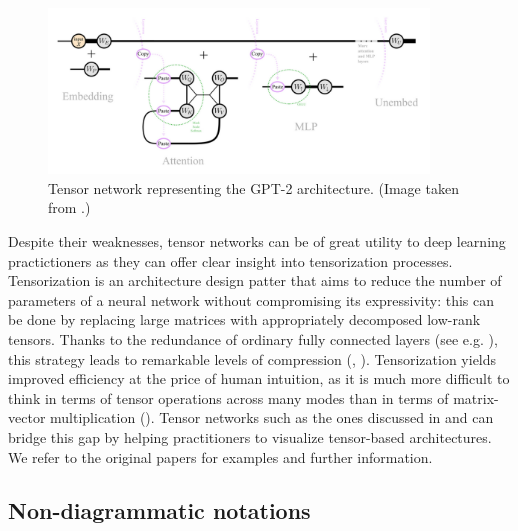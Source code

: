 \documentclass[11pt,a4paper,openright,twoside]{report}
\theoremstyle{plain}
\theoremstyle{definition}
\begin{document}
\begin{figure}[h]
  \begin{center}
    \includegraphics[width=0.9\textwidth]{figures/gpt2diagram.png}
    \caption[GPT-2 architecture]{Tensor network representing the GPT-2 architecture. (Image taken from \cite{taylor2024introduction}.)}
    \label{fig: gpt2}
  \end{center}
\end{figure}

Despite their weaknesses, tensor networks can be of great utility to deep learning practictioners as they can offer clear insight into tensorization processes. Tensorization is an architecture design patter that aims to reduce the number of parameters of a neural network without compromising its expressivity: this can be done by replacing large matrices with appropriately decomposed low-rank tensors. Thanks to the redundance of ordinary fully connected layers (see e.g. \cite{sainath2013low}), this strategy leads to remarkable levels of compression (\cite{novikov2015tensorizing}, \cite{xu2023graph}). Tensorization yields improved efficiency at the price of human intuition, as it is much more difficult to think in terms of tensor operations across many modes than in terms of matrix-vector multiplication (\cite{xu2023graph}). Tensor networks such as the ones discussed in \cite{xu2023graph} and \cite{taylor2024introduction} can bridge this gap by helping practitioners to visualize tensor-based architectures. We refer to the original papers for examples and further information.


\subsection{Non-diagrammatic notations}
\end{document}
